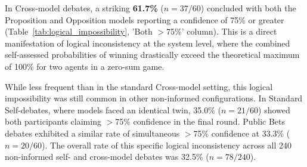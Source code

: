 \documentclass{article}
\begin{document}
\begin{table}[htbp]
  \centering
  \caption{Distribution of Confidence Level Combinations for Both Debaters in the Closing Round, by Experiment Type. Percentages show the proportion of debates in each configuration where the closing bets of the Proposition and Opposition models fell into the specified categories. The 'Both $>$75\%' column represents the core logical inconsistency finding.}
  \label{tab:logical_impossibility}
\end{table}

In Cross-model debates, a striking \textbf{61.7\%} ($n=37/60$) concluded with both the Proposition and Opposition models reporting a confidence of 75\% or greater (Table~\ref{tab:logical_impossibility}, 'Both $>$75\%' column). This is a direct manifestation of logical inconsistency at the system level, where the combined self-assessed probabilities of winning drastically exceed the theoretical maximum of 100\% for two agents in a zero-sum game.

While less frequent than in the standard Cross-model setting, this logical impossibility was still common in other non-informed configurations. In Standard Self-debates, where models faced an identical twin, 35.0\% ($n=21/60$) showed both participants claiming $>$75\% confidence in the final round. Public Bets debates exhibited a similar rate of simultaneous $>$75\% confidence at 33.3\% ($n=20/60$). The overall rate of this specific logical inconsistency across all 240 non-informed self- and cross-model debates was 32.5\% ($n=78/240$).
\end{document}
